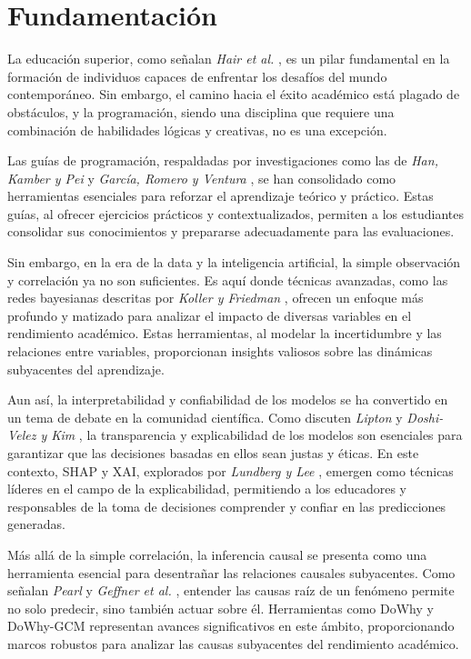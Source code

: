 \hypertarget{Fundamentación}{%
\section{Fundamentación}\label{Fundamentación}}

La educación superior, como señalan \textit{Hair et al.} \cite{hair2019advanced}, es un pilar fundamental en la formación de individuos capaces de enfrentar los desafíos del mundo contemporáneo. Sin embargo, el camino hacia el éxito académico está plagado de obstáculos, y la programación, siendo una disciplina que requiere una combinación de habilidades lógicas y creativas, no es una excepción.

Las guías de programación, respaldadas por investigaciones como las de \textit{Han, Kamber y Pei} \cite{han2011data} y \textit{García, Romero y Ventura} \cite{garcia2018prediccion}, se han consolidado como herramientas esenciales para reforzar el aprendizaje teórico y práctico. Estas guías, al ofrecer ejercicios prácticos y contextualizados, permiten a los estudiantes consolidar sus conocimientos y prepararse adecuadamente para las evaluaciones.

Sin embargo, en la era de la data y la inteligencia artificial, la simple observación y correlación ya no son suficientes. Es aquí donde técnicas avanzadas, como las redes bayesianas descritas por \textit{Koller y Friedman} \cite{koller2009introduction}, ofrecen un enfoque más profundo y matizado para analizar el impacto de diversas variables en el rendimiento académico. Estas herramientas, al modelar la incertidumbre y las relaciones entre variables, proporcionan insights valiosos sobre las dinámicas subyacentes del aprendizaje.

Aun así, la interpretabilidad y confiabilidad de los modelos se ha convertido en un tema de debate en la comunidad científica. Como discuten \textit{Lipton} \cite{lipton2018mythos} y \textit{Doshi-Velez y Kim} \cite{doshivelez2017rigorous}, la transparencia y explicabilidad de los modelos son esenciales para garantizar que las decisiones basadas en ellos sean justas y éticas. En este contexto, SHAP y XAI, explorados por \textit{Lundberg y Lee} \cite{lundberg2017unified}, emergen como técnicas líderes en el campo de la explicabilidad, permitiendo a los educadores y responsables de la toma de decisiones comprender y confiar en las predicciones generadas.

Más allá de la simple correlación, la inferencia causal se presenta como una herramienta esencial para desentrañar las relaciones causales subyacentes. Como señalan \textit{Pearl} \cite{pearl2009introduction} y \textit{Geffner et al.} \cite{geffner2022deep}, entender las causas raíz de un fenómeno permite no solo predecir, sino también actuar sobre él. Herramientas como DoWhy \cite{sharma2020dowhy} y DoWhy-GCM \cite{blobaum2022dowhy} representan avances significativos en este ámbito, proporcionando marcos robustos para analizar las causas subyacentes del rendimiento académico.

